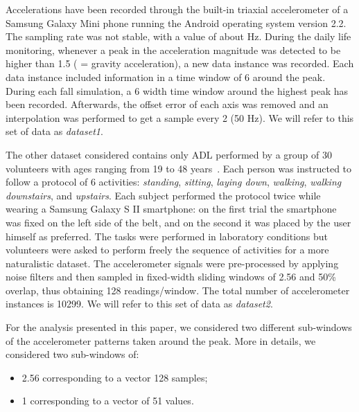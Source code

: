 \documentclass[twocolumn]{svjour3}          \smartqed  \usepackage[draft]{hyperref}
\begin{document}
Accelerations have been recorded through the
built-in triaxial accelerometer of a Samsung Galaxy Mini phone
running the Android operating system version 2.2. The sampling
rate was not stable, with a value of about  Hz. During the daily life monitoring,
whenever a peak in the acceleration magnitude was detected to be
higher than 1.5  ( = gravity acceleration), a new data instance was recorded. Each data instance included information in a time window of 6  around the peak.
During each fall simulation, a 6  width time window
around the highest peak has been recorded. Afterwards, the offset error of each axis was removed and an interpolation was performed to get a sample every 2  (50 Hz). We will refer to this set of data as \emph{dataset1}.

The other dataset considered contains only ADL performed by a group of 30 volunteers with ages ranging from 19 to 48 years~\citep{anguita2013public}. Each person was instructed to follow a protocol of 6 activities: \emph{standing}, \emph{sitting}, \emph{laying down}, \emph{walking}, \emph{walking downstairs}, and \emph{upstairs}. Each subject performed the protocol twice while wearing a Samsung Galaxy S II smartphone: on the first trial the smartphone was fixed on the left side of the belt, and on the second it was placed by the user himself as preferred. The tasks were performed in laboratory conditions but volunteers were asked to perform freely the sequence of activities for a more naturalistic dataset. The accelerometer signals were pre-processed by applying noise filters and then sampled in fixed-width sliding windows of 2.56  and 50\% overlap, thus obtaining 128 readings/window. The total number of accelerometer instances is 10299. We will refer to this set of data as \emph{dataset2}.

For the analysis presented in this paper, we considered two different sub-windows of the accelerometer patterns taken around  the peak. More in details, we considered two sub-windows of:
\begin{itemize}
\item  2.56  corresponding to a vector 128 samples;
\item 1  corresponding to a vector of 51 values.
\end{itemize}
\end{document}
